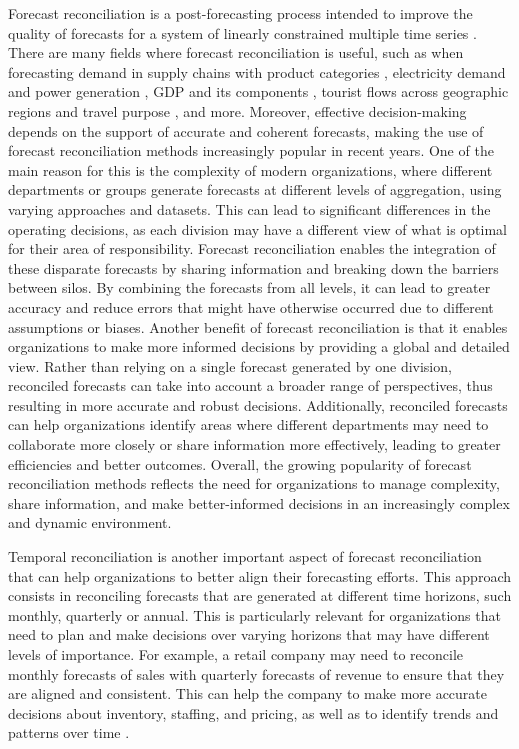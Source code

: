 \documentclass[12pt]{article}
\theoremstyle{definition}
\begin{document}
Forecast reconciliation is a post-forecasting process intended to improve the quality of forecasts for a system of linearly constrained multiple time series \citep{hyndman2011, panagiotelis2021}. There are many fields where forecast reconciliation is useful, such as when forecasting demand in supply chains with product categories \citep{punia2020, kourentzes2021}, electricity demand and power generation \citep{spiliotis2020, bentaieb2021}, GDP and its components \citep{athanasopoulos2020}, tourist flows across geographic regions and travel purpose \citep{kourentzes2019}, and more. Moreover, effective decision-making depends on the support of accurate and coherent forecasts, making the use of forecast reconciliation methods increasingly popular in recent years. One of the main reason for this is the complexity of modern organizations, where different departments or groups generate forecasts at different levels of aggregation, using varying approaches and datasets. This can lead to significant differences in the operating decisions, as each division may have a different view of what is optimal for their area of responsibility. Forecast reconciliation enables the integration of these disparate forecasts by sharing information and breaking down the barriers between silos. By combining the forecasts from all levels, it can lead to greater accuracy and reduce errors that might have otherwise occurred due to different assumptions or biases.
Another benefit of forecast reconciliation is that it enables organizations to make more informed decisions by providing a global and detailed view. Rather than relying on a single forecast generated by one division, reconciled forecasts can take into account a broader range of perspectives, thus resulting in more accurate and robust decisions. Additionally, reconciled forecasts can help organizations identify areas where different departments may need to collaborate more closely or share information more effectively, leading to greater efficiencies and better outcomes. Overall, the growing popularity of forecast reconciliation methods reflects the need for organizations to manage complexity, share information, and make better-informed decisions in an increasingly complex and dynamic environment.

Temporal reconciliation is another important aspect of forecast reconciliation that can help organizations to better align their forecasting efforts. This approach consists in reconciling forecasts that are generated at different time horizons, such monthly, quarterly or annual. This is particularly relevant for organizations that need to plan and make decisions over varying horizons that may have different levels of importance. For example, a retail company may need to reconcile monthly forecasts of sales with quarterly forecasts of revenue to ensure that they are aligned and consistent. This can help the company to make more accurate decisions about inventory, staffing, and pricing, as well as to identify trends and patterns over time \citep{kourentzes2022}.
\end{document}
